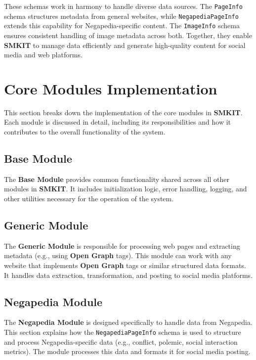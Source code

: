 These schemas work in harmony to handle diverse data sources. The \texttt{PageInfo} schema structures metadata from general websites, while \texttt{NegapediaPageInfo} extends this capability for Negapedia-specific content. The \texttt{ImageInfo} schema ensures consistent handling of image metadata across both. Together, they enable \textbf{SMKIT} to manage data efficiently and generate high-quality content for social media and web platforms.


\section{Core Modules Implementation}
\label{sec:core_modules_implementation}
This section breaks down the implementation of the core modules in \textbf{SMKIT}. Each module is discussed in detail, including its responsibilities and how it contributes to the overall functionality of the system.

\subsection{Base Module}
\label{subsec:base_module}
The \textbf{Base Module} provides common functionality shared across all other modules in \textbf{SMKIT}. It includes initialization logic, error handling, logging, and other utilities necessary for the operation of the system.

\subsection{Generic Module}
\label{subsec:generic_module}
The \textbf{Generic Module} is responsible for processing web pages and extracting metadata (e.g., using \textbf{Open Graph} tags). This module can work with any website that implements \textbf{Open Graph} tags or similar structured data formats. It handles data extraction, transformation, and posting to social media platforms.

\subsection{Negapedia Module}
\label{subsec:negapedia_module}
The \textbf{Negapedia Module} is designed specifically to handle data from Negapedia. This section explains how the \texttt{NegapediaPageInfo} schema is used to structure and process Negapedia-specific data (e.g., conflict, polemic, social interaction metrics). The module processes this data and formats it for social media posting.

